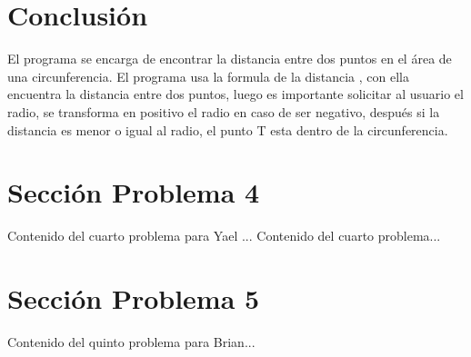 \documentclass{IEEEcsmag}
\begin{document}
\section{Conclusión}
El programa se encarga de encontrar la distancia entre dos puntos en el área de una circunferencia. El programa usa la formula de la distancia , con ella encuentra la distancia entre dos puntos, luego es importante solicitar al usuario el radio, se transforma en positivo el radio en caso de ser negativo, después si la distancia es menor o igual al  radio, el punto T esta dentro de la circunferencia.
   


























\newpage 


\section{Sección Problema 4}
Contenido del cuarto problema para Yael ...
\newpage 
Contenido del cuarto problema...
\newpage 


\section{Sección Problema 5}
Contenido del quinto problema para Brian...
\newpage 
    
\end{document}
